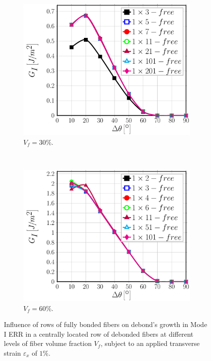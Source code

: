 \documentclass[review]{elsarticle}
\begin{document}
\begin{figure}[!h]
\centering
    \begin{subfigure}[b]{0.45\textwidth}
        \includegraphics[width=\textwidth]{abovefibers-vf30-GI.pdf}
        \caption{$V_{f}=30\%$.}\label{subfig:abovefiber30MI}
    \end{subfigure} ~
    \begin{subfigure}[b]{0.45\textwidth}
        \includegraphics[width=\textwidth]{abovefibers-vf60-GI.pdf}
        \caption{$V_{f}=60\%$.}\label{subfig:abovefiber60MI}
    \end{subfigure}

\caption{Influence of rows of fully bonded fibers on debond's growth in Mode I ERR in a centrally located row of debonded fibers at different levels of fiber volume fraction $V_{f}$, subject to an applied transverse strain $\varepsilon_{x}$ of $1\%$.}\label{fig:abovefibersMI}
\end{figure}
\end{document}
